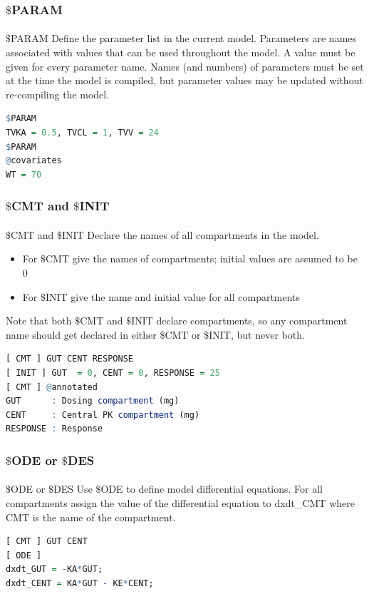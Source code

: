 \documentclass[
	11pt, %
]{beamer}
\begin{document}
\begin{frame}[fragile]
	\frametitle{$\$$PARAM}
	\framesubtitle{} %

	\begin{block}{$\$$PARAM}
	\small
Define the parameter list in the current model. Parameters are names associated with values that can be used throughout the model. A value must be given for every parameter name. Names (and numbers) of parameters must be set at the time the model is compiled, but parameter values may be updated without re-compiling the model.
 
\begin{lstlisting}[language=R]	
$PARAM
TVKA = 0.5, TVCL = 1, TVV = 24
$PARAM
@covariates
WT = 70
\end{lstlisting}
	\end{block}

\end{frame}




\begin{frame}[fragile]
	\frametitle{$\$$CMT and $\$$INIT}
	\framesubtitle{} %

	\begin{block}{$\$$CMT and $\$$INIT}
	\small
Declare the names of all compartments in the model.
\begin{itemize}
\item For $\$$CMT give the names of compartments; initial values are assumed to be 0
\item For $\$$INIT give the name and initial value for all compartments
\end{itemize}
Note that both $\$$CMT and $\$$INIT declare compartments, so any compartment name should get declared in either $\$$CMT or $\$$INIT, but never both.
 \tiny
\begin{lstlisting}[language=R]	
[ CMT ] GUT CENT RESPONSE
[ INIT ] GUT  = 0, CENT = 0, RESPONSE = 25
[ CMT ] @annotated
GUT      : Dosing compartment (mg)
CENT     : Central PK compartment (mg)
RESPONSE : Response
\end{lstlisting}
	\end{block}

\end{frame}



\begin{frame}[fragile]
	\frametitle{$\$$ODE or $\$$DES}
	\framesubtitle{} %
	\begin{block}{$\$$ODE or $\$$DES}
	\small
Use $\$$ODE to define model differential equations. For all compartments assign the value of the differential equation to dxdt\_CMT where CMT is the name of the compartment. 
\begin{lstlisting}[language=R]
[ CMT ] GUT CENT
[ ODE ]
dxdt_GUT = -KA*GUT;
dxdt_CENT = KA*GUT - KE*CENT;
\end{lstlisting}
	\end{block}

\end{frame}
\end{document}
